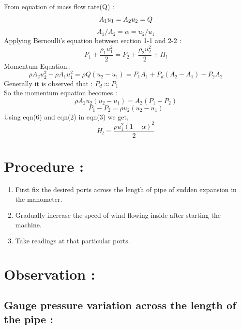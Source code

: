 \documentclass[12pt,a4paper]{article}
\begin{document}
From equation of mass flow rate(Q) :
\begin{equation}
    A_1 u_1 = A_2 u_2 = Q\\
\end{equation}
\begin{equation}
    A_1/A_2 = \alpha = u_2 /u_1
\end{equation}
Applying Bernoulli's equation between section 1-1 and 2-2 :
\begin{equation}
    P_1 + \frac{\rho_1 u_1^{2}}{2} = P_2 + \frac{\rho_2 u_2^{2}}{2} + H_l 
\end{equation}
Momentum Equation.:
\begin{equation}
    \rho A_2 u_2^{2}-\rho A_1 u_1^{2} = \rho Q (u_2 - u_1) = P_1 A_1 + P_d(A_2-A_1)-P_2A_2
\end{equation}
Generally it is observed that : $P_d \approx P_1$\\
So the momentum equation becomes :
\begin{equation}
    \rho A_2 u_2(u_2 - u_1) = A_2 (P_1-P_2)
\end{equation}
\begin{equation}
    P_1-P_2 = \rho u_2(u_2-u_1)
\end{equation}
Using eqn(6) and eqn(2) in eqn(3) we get,
\begin{equation}
    H_l = \frac{\rho u_1^{2}(1-\alpha)^{2}}{2}
\end{equation}


\section{Procedure :}
\begin{enumerate}
    \item First fix the desired ports across the length of pipe of sudden expansion in the manometer.
    \item Gradually increase the speed of wind flowing inside after starting the machine.
    \item Take readings at that particular ports.
\end{enumerate}






\section{Observation :}

\subsection{Gauge pressure variation across the length of the pipe :}
 
\end{document}
